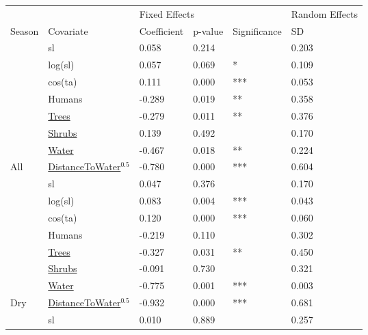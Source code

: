
\begin{tabular}[t]{llllll}
\toprule
\multicolumn{1}{l}{} & \multicolumn{1}{l}{} & \multicolumn{3}{l}{Fixed Effects} & \multicolumn{1}{l}{Random Effects} \\
\cmidrule(l{3pt}r{3pt}){3-5} \cmidrule(l{3pt}r{3pt}){6-6}
Season & Covariate & Coefficient & p-value & Significance & SD\\
\midrule
 & sl & 0.058 & 0.214 &  & 0.203\\

 & log(sl) & 0.057 & 0.069 & * & 0.109\\

 & cos(ta) & 0.111 & 0.000 & *** & 0.053\\

 & Humans & -0.289 & 0.019 & ** & 0.358\\

 & \underline{Trees} & -0.279 & 0.011 & ** & 0.376\\

 & \underline{Shrubs} & 0.139 & 0.492 &  & 0.170\\

 & \underline{Water} & -0.467 & 0.018 & ** & 0.224\\

\multirow{-8}{*}{\raggedright\arraybackslash All} & \underline{DistanceToWater}$^{0.5}$ & -0.780 & 0.000 & *** & 0.604\\
\cmidrule{1-6}
 & sl & 0.047 & 0.376 &  & 0.170\\

 & log(sl) & 0.083 & 0.004 & *** & 0.043\\

 & cos(ta) & 0.120 & 0.000 & *** & 0.060\\

 & Humans & -0.219 & 0.110 &  & 0.302\\

 & \underline{Trees} & -0.327 & 0.031 & ** & 0.450\\

 & \underline{Shrubs} & -0.091 & 0.730 &  & 0.321\\

 & \underline{Water} & -0.775 & 0.001 & *** & 0.003\\

\multirow{-8}{*}{\raggedright\arraybackslash Dry} & \underline{DistanceToWater}$^{0.5}$ & -0.932 & 0.000 & *** & 0.681\\
\cmidrule{1-6}
 & sl & 0.010 & 0.889 &  & 0.257\\


\end{tabular}
